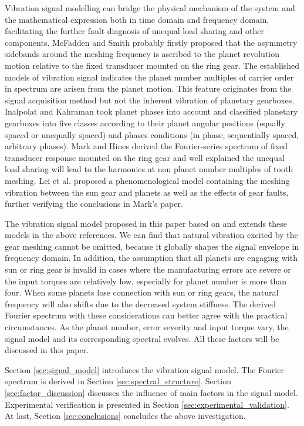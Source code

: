 \documentclass[a4paper,fleqn]{cas-sc}%
\begin{document}
\par Vibration signal modelling can bridge the physical mechanism of the system and the mathematical expression both in time domain and frequency domain, facilitating the further fault diagnosis of unequal load sharing and other components. McFadden and Smith \cite{McFadden1985} probably firstly proposed that the asymmetry sidebands around the meshing frequency is ascribed to the planet revolution motion relative to the fixed transducer mounted on the ring gear. The established models of vibration signal indicates the planet number multiples of carrier order in spectrum are arisen from the planet motion. This feature originates from the signal acquisition method but not the inherent vibration of planetary gearboxes. Inalpolat and Kahraman \cite{Inalpolat2009} took planet phases into account and classified planetary gearboxes into five classes according to their planet angular positions (equally spaced or unequally spaced) and phases conditions (in phase, sequentially spaced, arbitrary phases). Mark and Hines \cite{Mark2009} derived the Fourier-series spectrum of fixed transducer response mounted on the ring gear and well explained the unequal load sharing will lead to the harmonics at non planet number multiples of tooth meshing. Lei \cite{Lei2016} et al. proposed a phenomenological model containing the meshing vibration between the sun gear and planets as well as the effects of gear faults, further verifying the conclusions in Mark's paper.
\par The vibration signal model proposed in this paper based on and extends these models in the above references. We  can find that natural vibration excited by the gear meshing cannot be omitted, because it globally shapes the signal envelope in frequency domain. In addition, the assumption that all planets are engaging with sun or ring gear is invalid in cases where the manufacturing errors are severe or the input torques are relatively low, especially for planet number is more than four. When some planets lose connection with sun or ring gears, the natural frequency will also shifts due to the decreased system stiffness. The derived Fourier spectrum with these considerations can better agree with the practical circumstances. As the planet number, error severity and input torque vary, the signal model and its corresponding spectral evolves. All these factors will be discussed in this paper.
\par Section \ref{sec:signal_model} introduces the vibration signal model. The Fourier spectrum is derived in Section \ref{sec:spectral_structure}. Section \ref{sec:factor_discussion} discusses the influence of main factors in the signal model. Experimental verification is presented in Section \ref{sec:experimental_validation}. At last, Section \ref{sec:conclusions} concludes the above investigation. 
\end{document}
